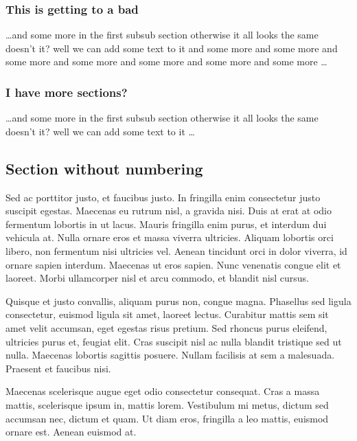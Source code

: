\documentclass[11pt,times]{article}
\begin{document}
\subsubsection{This is getting to a bad} %
\dots and some more in the first subsub section otherwise it all looks the same
doesn't it? well we can add some text to it and some more and some more and
some more and some more and some more and some more and some more \dots

\subsubsection{I have more sections?} %
\dots and some more in the first subsub section otherwise it all looks the same
doesn't it? well we can add some text to it \dots

\subsection*{Section without numbering} %

Sed ac porttitor justo, et faucibus justo. In fringilla enim consectetur justo 
suscipit egestas. Maecenas eu rutrum nisl, a gravida nisi. Duis at erat at odio 
fermentum lobortis in ut lacus. Mauris fringilla enim purus, et interdum dui 
vehicula at. Nulla ornare eros et massa viverra ultricies. Aliquam lobortis 
orci libero, non fermentum nisi ultricies vel. Aenean tincidunt orci in dolor 
viverra, id ornare sapien interdum. Maecenas ut eros sapien. Nunc venenatis 
congue elit et laoreet. Morbi ullamcorper nisl et arcu commodo, et blandit nisl 
cursus.

Quisque et justo convallis, aliquam purus non, congue magna. Phasellus sed 
ligula consectetur, euismod ligula sit amet, laoreet lectus. Curabitur mattis 
sem sit amet velit accumsan, eget egestas risus pretium. Sed rhoncus purus 
eleifend, ultricies purus et, feugiat elit. Cras suscipit nisl ac nulla blandit 
tristique sed ut nulla. Maecenas lobortis sagittis posuere. Nullam facilisis at 
sem a malesuada. Praesent et faucibus nisi.

Maecenas scelerisque augue eget odio consectetur consequat. Cras a massa 
mattis, scelerisque ipsum in, mattis lorem. Vestibulum mi metus, dictum sed 
accumsan nec, dictum et quam. Ut diam eros, fringilla a leo mattis, euismod 
ornare est. Aenean euismod at. 
\end{document}
